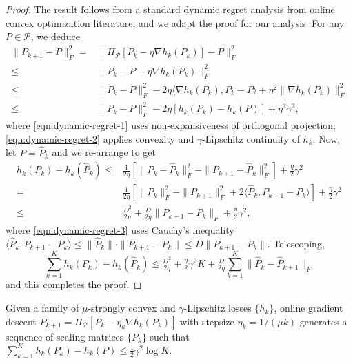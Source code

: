 \begin{proof}
The result follows from a standard dynamic regret analysis from online convex
optimization literature, and we adapt the proof for our analysis. For any $P
\in \mathcal{P}$, we deduce
\begin{align}
  \| P_{k + 1} - P \|_F^2 ={} & \| \Pi_{\mathcal{P}} [P_k - \eta \nabla h_k
  (P_k)] - P \|_F^2 \nonumber\\
  \leq{} & \| P_k - P - \eta \nabla h_k (P_k) \|_F^2 \label{eqn:dynamic-regret-1} \\
  \leq{} & \| P_k - P \|_F^2 - 2 \eta \langle \nabla h_k (P_k), P_k - P \rangle
  + \eta^2 \| \nabla h_k (P_k) \|^2_F \nonumber \\
  \leq{} & \| P_k - P \|_F^2 - 2 \eta [h_k (P_k) - h_k (P)] + \eta^2 \gamma^2, \label{eqn:dynamic-regret-2} 
\end{align}
where \eqref{eqn:dynamic-regret-1} uses non-expansiveness of orthogonal projection; \eqref{eqn:dynamic-regret-2} applies convexity and $\gamma$-Lipschitz continuity of $h_k$.
Now, let $P = \hat{P}_k$ and we re-arrange to get
\begin{align}
  h_k (P_k) - h_k (\hat{P}_k) \leq{} & \tfrac{1}{2 \eta} [\| P_k - \hat{P}_k
  \|_F^2 - \| P_{k + 1} - \hat{P}_k \|_F^2] + \tfrac{\eta}{2} \gamma^2
  \nonumber\\
  ={} & \tfrac{1}{2 \eta} [\| P_k \|_F^2 - \| P_{k + 1} \|_F^2 + 2 \langle
  \hat{P}_k, P_{k + 1} - P_k \rangle] + \tfrac{\eta}{2} \gamma^2 \nonumber\\
  \leq{} & \tfrac{D^2}{2 \eta} + \tfrac{D}{2 \eta} \| P_{k + 1} - P_k \|_F +
  \tfrac{\eta}{2} \gamma^2,\label{eqn:dynamic-regret-3}
\end{align}
where \eqref{eqn:dynamic-regret-3} uses Cauchy's inequality $\langle
  \hat{P}_k, P_{k + 1} - P_k \rangle \leq \|\hat{P}_k\|\cdot\|P_{k + 1} - P_k\| \leq D\|P_{k + 1} - P_k\|$. 
   Telescoping,
\[ \textstyle \sum_{k = 1}^K h_k (P_k) - h_k (\hat{P}_k) \leq \tfrac{D^2}{2 \eta} +
   \tfrac{\eta}{2} \gamma^2 K + \tfrac{D}{2 \eta} \sum_{k = 1}^K \| \hat{P}_k
   - \hat{P}_{k + 1} \|_F \]
and this completes the proof.
\end{proof}
\begin{lem} \label{lem:auxi-log-regret}
  Given a family of $\mu$-strongly convex and $\gamma$-Lipschitz losses $\{
  h_k \}$, online gradient descent $P_{k + 1} = \Pi_{\mathcal{P}} [P_k - \eta_k \nabla h_k
  (P_k)]$ with stepsize $\eta_k = 1 / (\mu k)$
  generates a sequence of scaling matrices $\{ P_k \}$ such that $\sum_{k =
  1}^K h_k (P_k) - h_k (P) \leq \tfrac{1}{2} \gamma^2 \log K.$
\end{lem}

